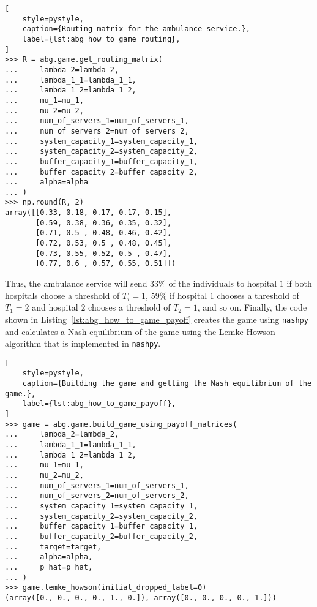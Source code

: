 \begin{lstlisting}[
    style=pystyle,
    caption={Routing matrix for the ambulance service.},
    label={lst:abg_how_to_game_routing},
]
>>> R = abg.game.get_routing_matrix(
...     lambda_2=lambda_2,
...     lambda_1_1=lambda_1_1,
...     lambda_1_2=lambda_1_2,
...     mu_1=mu_1,
...     mu_2=mu_2,
...     num_of_servers_1=num_of_servers_1,
...     num_of_servers_2=num_of_servers_2,
...     system_capacity_1=system_capacity_1,
...     system_capacity_2=system_capacity_2,
...     buffer_capacity_1=buffer_capacity_1,
...     buffer_capacity_2=buffer_capacity_2,
...     alpha=alpha
... )
>>> np.round(R, 2)
array([[0.33, 0.18, 0.17, 0.17, 0.15],
       [0.59, 0.38, 0.36, 0.35, 0.32],
       [0.71, 0.5 , 0.48, 0.46, 0.42],
       [0.72, 0.53, 0.5 , 0.48, 0.45],
       [0.73, 0.55, 0.52, 0.5 , 0.47],
       [0.77, 0.6 , 0.57, 0.55, 0.51]])

\end{lstlisting}

Thus, the ambulance service will send \(33\%\) of the individuals to hospital
\(1\) if both hospitals choose a threshold of \(T_i = 1\), \(59\%\) if hospital
\(1\) chooses a threshold of \(T_1 = 2\) and hospital \(2\) chooses a threshold
of \(T_2 = 1\), and so on.
Finally, the code shown in Listing~\ref{lst:abg_how_to_game_payoff} creates the
game using \texttt{nashpy} and calculates a Nash equilibrium of the game
using the Lemke-Howson algorithm that is implemented in \texttt{nashpy}.

\begin{lstlisting}[
    style=pystyle,
    caption={Building the game and getting the Nash equilibrium of the game.},
    label={lst:abg_how_to_game_payoff},
]
>>> game = abg.game.build_game_using_payoff_matrices(
...     lambda_2=lambda_2,
...     lambda_1_1=lambda_1_1,
...     lambda_1_2=lambda_1_2,
...     mu_1=mu_1,
...     mu_2=mu_2,
...     num_of_servers_1=num_of_servers_1,
...     num_of_servers_2=num_of_servers_2,
...     system_capacity_1=system_capacity_1,
...     system_capacity_2=system_capacity_2,
...     buffer_capacity_1=buffer_capacity_1,
...     buffer_capacity_2=buffer_capacity_2,
...     target=target,
...     alpha=alpha,
...     p_hat=p_hat,
... )
>>> game.lemke_howson(initial_dropped_label=0)
(array([0., 0., 0., 0., 1., 0.]), array([0., 0., 0., 0., 1.]))
    
\end{lstlisting}

